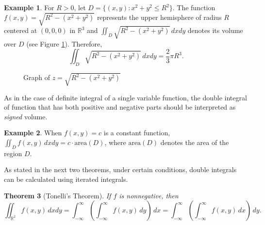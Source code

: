 \documentclass[12pt,letterpaper]{book}
\numberwithin{equation}{section}
\newtheorem{thm}{\textbf{Theorem}}[section]
\theoremstyle{definition}
\newtheorem{example}[thm]{\textbf{Example}}
\begin{document}
\begin{example}
For $R>0$, let $D=\{(x,y):x^2+y^2\leq R^2\}$. The function $f(x,y)=\sqrt{R^2-(x^2+y^2)}$ represents the upper hemisphere of radius $R$ centered at $(0,0,0)$ in $\mathbb{R}^3$ and $\displaystyle{\iint_D \sqrt{R^2-(x^2+y^2)}\,dxdy}$ denotes its volume over $D$ (see Figure \ref{hemisphere}). Therefore,  $$\iint_D \sqrt{R^2-(x^2+y^2)}\,dxdy=\frac{2}{3}\pi R^3.$$

\begin{figure}[h]
\begin{center}
\end{center}
\caption{Graph of $z=\sqrt{R^2-(x^2+y^2)}$}
\label{hemisphere}
\end{figure}
\end{example}

As in the case of definite integral of a single variable function, the double integral of function that has both positive and negative parts should be interpreted as \textit{signed} volume.

\begin{example}
When $f(x,y)=c$ is a constant function, $\displaystyle{\iint_D f(x,y)\,dxdy=c\cdot\text{area}(D)}$, where $\text{area}(D)$ denotes the area of the region $D$.
\end{example}

As stated in the next two theorems, under certain conditions, double integrals can be calculated using iterated integrals.

\begin{thm}[Tonelli's Theorem] If $f$ is nonnegative, then
$$\iint_{\mathbb{R}^2} f(x,y)\,dxdy=\int_{-\infty}^\infty \left(\int_{-\infty}^\infty f(x,y)\,dy\right)\,dx=\int_{-\infty}^\infty \left(\int_{-\infty}^\infty f(x,y)\,dx\right)\,dy.$$
\end{thm}
\end{document}
